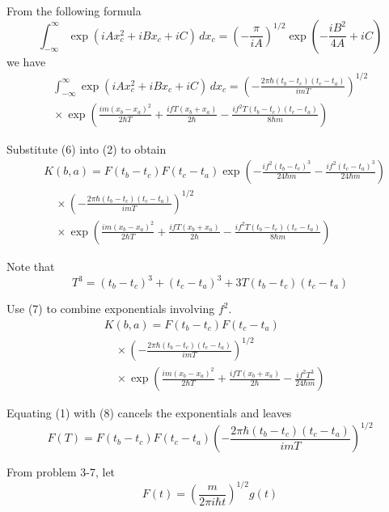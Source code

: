 \documentclass[12pt]{article}
\begin{document}
\bigskip
From the following formula
\begin{equation*}
\int_{-\infty}^{\infty}\exp(iAx_c^2+iBx_c+iC)\,dx_c
=\left(-\frac{\pi}{iA}\right)^{1/2}
\exp\left(-\frac{iB^2}{4A}+iC\right)
\end{equation*}
we have
\begin{multline*}
\int_{-\infty}^{\infty}\exp(iAx_c^2+iBx_c+iC)\,dx_c
=\left(-\frac{2\pi\hbar(t_b-t_c)(t_c-t_a)}{imT}\right)^{1/2}
\\
{}\times\exp\left(
\frac{im(x_b-x_a)^2}{2\hbar T}
+\frac{ifT(x_b+x_a)}{2\hbar}
-\frac{if^2T(t_b-t_c)(t_c-t_a)}{8\hbar m}
\right)
\tag{6}
\end{multline*}

Substitute (6) into (2) to obtain
\begin{align*}
&K(b,a)=F(t_b-t_c)F(t_c-t_a)
\exp\left(-\frac{if^2(t_b-t_c)^3}{24\hbar m}-\frac{if^2(t_c-t_a)^3}{24\hbar m}\right)
\\
&\quad{}\times
\left(-\frac{2\pi\hbar(t_b-t_c)(t_c-t_a)}{imT}\right)^{1/2}
\\
&\quad{}\times
\exp\left(
\frac{im(x_b-x_a)^2}{2\hbar T}
+\frac{ifT(x_b+x_a)}{2\hbar}
-\frac{if^2T(t_b-t_c)(t_c-t_a)}{8\hbar m}
\right)
\end{align*}

Note that
\begin{equation*}
T^3=(t_b-t_c)^3+(t_c-t_a)^3+3T(t_b-t_c)(t_c-t_a)
\tag{7}
\end{equation*}

Use (7) to combine exponentials involving $f^2$.
\begin{align*}
&K(b,a)=F(t_b-t_c)F(t_c-t_a)
\\
&\quad{}\times
\left(-\frac{2\pi\hbar(t_b-t_c)(t_c-t_a)}{imT}\right)^{1/2}
\\
&\quad{}\times
\exp\left(
\frac{im(x_b-x_a)^2}{2\hbar T}
+\frac{ifT(x_b+x_a)}{2\hbar}
-\frac{if^2T^3}{24\hbar m}
\right)
\tag{8}
\end{align*}

Equating (1) with (8) cancels the exponentials and leaves
\begin{equation*}
F(T)=F(t_b-t_c)F(t_c-t_a)
\left(-\frac{2\pi\hbar(t_b-t_c)(t_c-t_a)}{imT}\right)^{1/2}
\tag{9}
\end{equation*}

From problem 3-7, let
\begin{equation*}
F(t)=\left(\frac{m}{2\pi i\hbar t}\right)^{1/2} g(t)
\tag{10}
\end{equation*}
\end{document}
